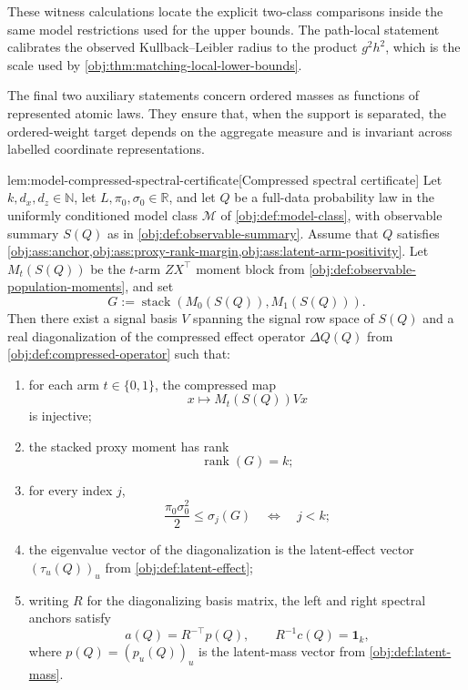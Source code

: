 \documentclass[11pt]{article}
\begin{document}
These witness calculations locate the explicit two-class comparisons inside the same model restrictions used for the upper bounds. The path-local statement calibrates the observed Kullback--Leibler radius to the product \(g^2h^2\), which is the scale used by \cref{obj:thm:matching-local-lower-bounds}.

The final two auxiliary statements concern ordered masses as functions of represented atomic laws. They ensure that, when the support is separated, the ordered-weight target depends on the aggregate measure and is invariant across labelled coordinate representations.

\begin{lemmav}{lem:model-compressed-spectral-certificate}[Compressed spectral certificate]
Let \(k,d_x,d_z\in\mathbb N\), let \(L,\pi_0,\sigma_0\in\mathbb R\), and let \(Q\) be a full-data probability law in the uniformly conditioned model class \(\mathcal M\) of \cref{obj:def:model-class}, with observable summary \(S(Q)\) as in \cref{obj:def:observable-summary}. Assume that \(Q\) satisfies \cref{obj:ass:anchor,obj:ass:proxy-rank-margin,obj:ass:latent-arm-positivity}. Let \(M_t(S(Q))\) be the \(t\)-arm \(ZX^\top\) moment block from \cref{obj:def:observable-population-moments}, and set
\[
G:=\operatorname{stack}(M_0(S(Q)),M_1(S(Q))).
\]
Then there exist a signal basis \(V\) spanning the signal row space of \(S(Q)\) and a real diagonalization of the compressed effect operator \(\Delta Q(Q)\) from \cref{obj:def:compressed-operator} such that:
\begin{enumerate}
\item for each arm \(t\in\{0,1\}\), the compressed map
\[
x\longmapsto M_t(S(Q))Vx
\]
is injective;
\item the stacked proxy moment has rank
\[
\operatorname{rank}(G)=k;
\]
\item for every index \(j\),
\[
\frac{\pi_0\sigma_0^2}{2}\le \sigma_j(G)
\quad\Longleftrightarrow\quad
j<k;
\]
\item the eigenvalue vector of the diagonalization is the latent-effect vector \((\tau_u(Q))_u\) from \cref{obj:def:latent-effect};
\item writing \(R\) for the diagonalizing basis matrix, the left and right spectral anchors satisfy
\[
a(Q)=R^{-\top}p(Q),
\qquad
R^{-1}c(Q)=\mathbf 1_k,
\]
where \(p(Q)=(p_u(Q))_u\) is the latent-mass vector from \cref{obj:def:latent-mass}.
\end{enumerate}
\end{lemmav}
\end{document}
